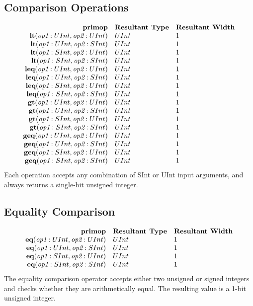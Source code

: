 \documentclass[12pt]{article}
\begin{document}
\subsection{Comparison Operations}
\[
\begin{array}{rll}
\text{\bf primop} & \text{\bf Resultant Type} & \text{\bf Resultant Width} \\
\text{\bf lt}      (\text{\em op1}:UInt, \text{\em op2}:UInt) & UInt & 1    \\
\text{\bf lt}      (\text{\em op1}:UInt, \text{\em op2}:SInt) & UInt & 1    \\
\text{\bf lt}      (\text{\em op1}:SInt, \text{\em op2}:UInt) & UInt & 1    \\
\text{\bf lt}      (\text{\em op1}:SInt, \text{\em op2}:SInt) & UInt & 1    \\
\text{\bf leq}     (\text{\em op1}:UInt, \text{\em op2}:UInt) & UInt & 1    \\
\text{\bf leq}     (\text{\em op1}:UInt, \text{\em op2}:SInt) & UInt & 1    \\
\text{\bf leq}     (\text{\em op1}:SInt, \text{\em op2}:UInt) & UInt & 1    \\
\text{\bf leq}     (\text{\em op1}:SInt, \text{\em op2}:SInt) & UInt & 1    \\
\text{\bf gt}      (\text{\em op1}:UInt, \text{\em op2}:UInt) & UInt & 1    \\
\text{\bf gt}      (\text{\em op1}:UInt, \text{\em op2}:SInt) & UInt & 1    \\
\text{\bf gt}      (\text{\em op1}:SInt, \text{\em op2}:UInt) & UInt & 1    \\
\text{\bf gt}      (\text{\em op1}:SInt, \text{\em op2}:SInt) & UInt & 1    \\
\text{\bf geq}     (\text{\em op1}:UInt, \text{\em op2}:UInt) & UInt & 1    \\
\text{\bf geq}     (\text{\em op1}:UInt, \text{\em op2}:SInt) & UInt & 1    \\
\text{\bf geq}     (\text{\em op1}:SInt, \text{\em op2}:UInt) & UInt & 1    \\
\text{\bf geq}     (\text{\em op1}:SInt, \text{\em op2}:SInt) & UInt & 1    \\
\end{array}
\]
Each operation accepts any combination of SInt or UInt input arguments, and always returns a single-bit unsigned integer.

\subsection{Equality Comparison}
\[
\begin{array}{rll}
\text{\bf primop} & \text{\bf Resultant Type} & \text{\bf Resultant Width} \\
\text{\bf eq}(\text{\em op1}:UInt, \text{\em op2}:UInt)     & UInt & 1 \\
\text{\bf eq}(\text{\em op1}:UInt, \text{\em op2}:SInt)     & UInt & 1 \\
\text{\bf eq}(\text{\em op1}:SInt, \text{\em op2}:UInt)     & UInt & 1 \\
\text{\bf eq}(\text{\em op1}:SInt, \text{\em op2}:SInt)     & UInt & 1 \\
\end{array}
\]
The equality comparison operator accepts either two unsigned or signed integers and checks whether they are arithmetically equal.
The resulting value is a 1-bit unsigned integer. 
\end{document}

